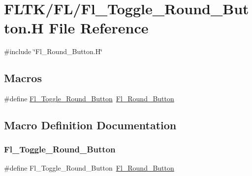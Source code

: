 \hypertarget{_fl___toggle___round___button_8_h}{}\section{F\+L\+T\+K/\+F\+L/\+Fl\+\_\+\+Toggle\+\_\+\+Round\+\_\+\+Button.H File Reference}
\label{_fl___toggle___round___button_8_h}
{\ttfamily \#include \char`\"{}Fl\+\_\+\+Round\+\_\+\+Button.\+H\char`\"{}}\newline
\subsection*{Macros}
\begin{DoxyCompactItemize}
\item 
\#define \hyperlink{_fl___toggle___round___button_8_h_af86e7387935ba01206dd03444c86f3a5}{Fl\+\_\+\+Toggle\+\_\+\+Round\+\_\+\+Button}~\hyperlink{class_fl___round___button}{Fl\+\_\+\+Round\+\_\+\+Button}
\end{DoxyCompactItemize}


\subsection{Macro Definition Documentation}
\mbox{\label{_fl___toggle___round___button_8_h_af86e7387935ba01206dd03444c86f3a5}} 
\subsubsection{\texorpdfstring{Fl\+\_\+\+Toggle\+\_\+\+Round\+\_\+\+Button}{Fl\_Toggle\_Round\_Button}}
{\footnotesize\ttfamily \#define Fl\+\_\+\+Toggle\+\_\+\+Round\+\_\+\+Button~\hyperlink{class_fl___round___button}{Fl\+\_\+\+Round\+\_\+\+Button}}

